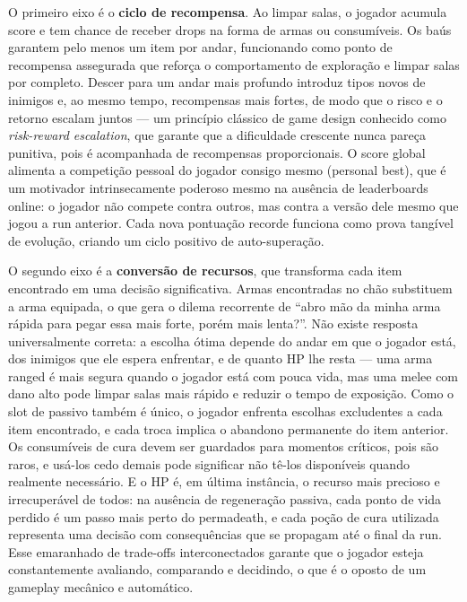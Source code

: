 \documentclass[12pt, a4paper]{article}
\begin{document}
O primeiro eixo \'e o \textbf{ciclo de recompensa}. Ao limpar salas, o jogador acumula score e tem chance de receber drops na forma de armas ou consum\'iveis. Os ba\'us garantem pelo menos um item por andar, funcionando como ponto de recompensa assegurada que refor\c{c}a o comportamento de explora\c{c}\~ao e limpar salas por completo. Descer para um andar mais profundo introduz tipos novos de inimigos e, ao mesmo tempo, recompensas mais fortes, de modo que o risco e o retorno escalam juntos --- um princ\'ipio cl\'assico de game design conhecido como \textit{risk-reward escalation}, que garante que a dificuldade crescente nunca pare\c{c}a punitiva, pois \'e acompanhada de recompensas proporcionais. O score global alimenta a competi\c{c}\~ao pessoal do jogador consigo mesmo (personal best), que \'e um motivador intrinsecamente poderoso mesmo na aus\^encia de leaderboards online: o jogador n\~ao compete contra outros, mas contra a vers\~ao dele mesmo que jogou a run anterior. Cada nova pontua\c{c}\~ao recorde funciona como prova tang\'ivel de evolu\c{c}\~ao, criando um ciclo positivo de auto-supera\c{c}\~ao.

O segundo eixo \'e a \textbf{convers\~ao de recursos}, que transforma cada item encontrado em uma decis\~ao significativa. Armas encontradas no ch\~ao substituem a arma equipada, o que gera o dilema recorrente de ``abro m\~ao da minha arma r\'apida para pegar essa mais forte, por\'em mais lenta?''. N\~ao existe resposta universalmente correta: a escolha \'otima depende do andar em que o jogador est\'a, dos inimigos que ele espera enfrentar, e de quanto HP lhe resta --- uma arma ranged \'e mais segura quando o jogador est\'a com pouca vida, mas uma melee com dano alto pode limpar salas mais r\'apido e reduzir o tempo de exposi\c{c}\~ao. Como o slot de passivo tamb\'em \'e \'unico, o jogador enfrenta escolhas excludentes a cada item encontrado, e cada troca implica o abandono permanente do item anterior. Os consum\'iveis de cura devem ser guardados para momentos cr\'iticos, pois s\~ao raros, e us\'a-los cedo demais pode significar n\~ao t\^e-los dispon\'iveis quando realmente necess\'ario. E o HP \'e, em \'ultima inst\^ancia, o recurso mais precioso e irrecuper\'avel de todos: na aus\^encia de regenera\c{c}\~ao passiva, cada ponto de vida perdido \'e um passo mais perto do permadeath, e cada po\c{c}\~ao de cura utilizada representa uma decis\~ao com consequ\^encias que se propagam at\'e o final da run. Esse emaranhado de trade-offs interconectados garante que o jogador esteja constantemente avaliando, comparando e decidindo, o que \'e o oposto de um gameplay mec\^anico e autom\'atico.
\end{document}
